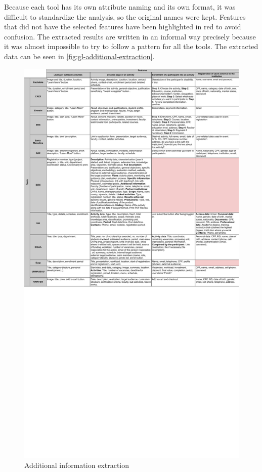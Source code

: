 Because each tool has its own attribute naming and its own format, it was difficult to standardize the analysis, so the original names were kept. Features that did not have the selected features have been highlighted in red to avoid confusion. The extracted results are written in an informal way precisely because it was almost impossible to try to follow a pattern for all the tools. The extracted data can be seen in \autoref{fig:gl-additional-extraction}.

\begin{figure}[htb]
  \caption{Additional information extraction}\label{fig:gl-additional-extraction}
  \begin{center}
    \includegraphics[width=16cm]{img/gl-data-extraction-2.pdf}
  \end{center}
\end{figure}

